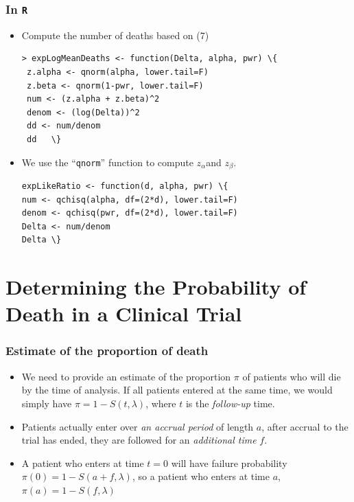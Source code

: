 \documentclass{beamer}
\newcommand{\empr}[1]{{\emph{\color{red}#1}}}
\begin{document}
\pagebreak
\begin{frame}[fragile]
\frametitle{In \texttt{R}}
\begin{itemize}
\item Compute the number of deaths based on (7)
\begin{Verbatim}
> expLogMeanDeaths <- function(Delta, alpha, pwr) \{
 z.alpha <- qnorm(alpha, lower.tail=F) 
 z.beta <- qnorm(1-pwr, lower.tail=F)
 num <- (z.alpha + z.beta)^2
 denom <- (log(Delta))^2
 dd <- num/denom 
 dd   \}
\end{Verbatim}
\item We use the ``\texttt{qnorm}'' function to compute $z_\alpha$and
$z_\beta$.
\begin{Verbatim}
expLikeRatio <- function(d, alpha, pwr) \{
num <- qchisq(alpha, df=(2*d), lower.tail=F) 
denom <- qchisq(pwr, df=(2*d), lower.tail=F) 
Delta <- num/denom
Delta \}
\end{Verbatim}
\end{itemize}
\end{frame}


\section{Determining the Probability of Death in a Clinical Trial}
\begin{frame}
\frametitle{Estimate of the proportion of death}
\begin{itemize}
\item We need to provide an estimate of the proportion $\pi$ of patients who will die by the time of analysis. If all patients entered at the same time, we would simply have $\pi = 1- S(t,\lambda)$, where $t$ is the \empr{follow-up} time.
\item Patients actually enter over \empr{an accrual period} of length $a$, after accrual to the trial has ended, they are followed for an \empr{additional time} $f$. 
\item A patient who enters at time $t=0$ will have failure probability $\pi(0)=1-S(a+f,\lambda)$, so a patient who enters at time $a$, $\pi(a)=1-S(f,\lambda)$
\end{itemize}
\end{frame}
\end{document}

